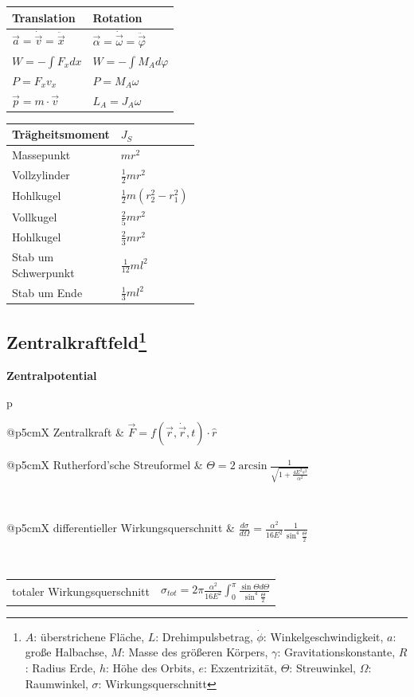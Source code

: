 \documentclass[12pt,a4paper, twoside]{article}
\makeatletter
\renewcommand{\d}[2]{\frac{d #1}{d #2}}
\renewcommand{\=}[1]{\stackrel{#1}{=}}
\theoremstyle{definition}
\theoremstyle{remark}
\newcommand{\concept}[2]{%
\noindent
\begin{framed}
\noindent\textbf{#1}
\par\begin{tabular}{p{\linewidth}}
#2
\end{tabular}
\end{framed}
}
\newcommand{\f}[2]{%
\noindent\begin{tabularx}{\linewidth}{@{}p{5cm}X}
#1 & $#2$
\end{tabularx}}
\makeatother
\begin{document}
\begin{center}
\begin{framed}
\begin{tabular}{ll}
Translation & Rotation\\
\midrule
$\vec{a} = \dot{\vec{v}} = \ddot{\vec{x}}$ & $\vec{\alpha} = \dot{\vec{\omega}} = \ddot{\vec{\varphi}}$\\
$W = -\int F_x dx$ & $W = -\int M_A d \varphi$ \\
$P = F_xv_x$ & $P = M_A \omega$ \\
$\vec{p} = m \cdot \vec{v}$ & $L_A = J_A \omega$ \\
\end{tabular}
\end{framed}
\end{center}

\begin{center}
\begin{framed}
\begin{tabular}{ll}
Trägheitsmoment & $J_S$\\
\midrule
Massepunkt & $mr^2$ \\
Vollzylinder & $\frac{1}{2}mr^2$ \\
Hohlkugel & $\frac{1}{2}m(r_2^2 - r_1^2)$ \\
Vollkugel & $\frac{2}{5}mr^2$ \\
Hohlkugel & $\frac{2}{3}mr^2$ \\
\makecell[l]{Stab um \\Schwerpunkt} & $\frac{1}{12}ml^2$ \\
Stab um Ende & $\frac{1}{3}ml^2$
\end{tabular}
\end{framed}
\end{center}


\subsection[Zentralkraftfeld]{Zentralkraftfeld\let\thefootnote\relax\footnote{$A$: überstrichene Fläche, $L$: Drehimpulsbetrag, $\dot \phi$: Winkelgeschwindigkeit, $a$: große Halbachse, $M$: Masse des größeren Körpers, $\gamma$: Gravitationskonstante, $R$: Radius Erde, $h$: Höhe des Orbits, $e$: Exzentrizität, $\Theta$: Streuwinkel, $\Omega$: Raumwinkel, $\sigma$: Wirkungsquerschnitt}}

\concept{Zentralpotential}{
\f{Zentralkraft}{\vec{F} = f(\vec{r}, \dot{\vec{r}}, t) \cdot \hat{r}}
\f{Rutherford'sche Streuformel}{\Theta = 2 \arcsin \frac{1}{\sqrt{1 + \frac{4 E^2 s ^2 }{\alpha ^2}}}}\\
\f{differentieller Wirkungsquerschnitt}{\d{\sigma}{\Omega} = \frac{\alpha ^2}{16E^2} \frac{1}{\sin^4 \frac{\Theta}{2}}}\\
\f{totaler Wirkungsquerschnitt}{\sigma_{tot} = 2\pi \frac{\alpha^2}{16E^2} \int_0^{\pi} \frac{\sin \Theta d\Theta}{\sin^4 \frac{\Theta}{2}}}
}
\end{document}
